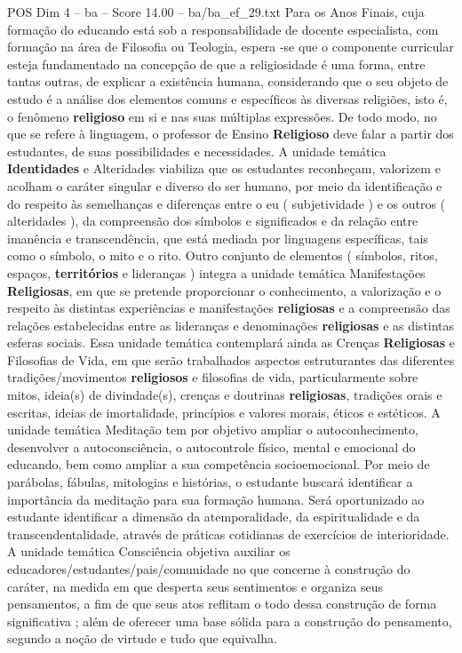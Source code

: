 \begin{textsample}{POS Dim 4 – ba – Score 14.00 – ba/ba\_ef\_29.txt}
Para os Anos Finais, cuja formação do educando está sob a responsabilidade de docente especialista, com formação na área de Filosofia ou Teologia, espera -se que o componente curricular esteja fundamentado na concepção de que a religiosidade é uma forma, entre tantas outras, de explicar a existência humana, considerando que o seu objeto de estudo é a análise dos elementos comuns e específicos às diversas religiões, isto é, o fenômeno \textbf{religioso} em si e nas suas múltiplas expressões.
De todo modo, no que se refere à linguagem, o professor de Ensino \textbf{Religioso} deve falar a partir dos estudantes, de suas possibilidades e necessidades.
A unidade temática \textbf{Identidades} e Alteridades viabiliza que os estudantes reconheçam, valorizem e acolham o caráter singular e diverso do ser humano, por meio da identificação e do respeito às semelhanças e diferenças entre o eu ( subjetividade ) e os outros ( alteridades ), da compreensão dos símbolos e significados e da relação entre imanência e transcendência, que está mediada por linguagens específicas, tais como o símbolo, o mito e o rito.
Outro conjunto de elementos ( símbolos, ritos, espaços, \textbf{territórios} e lideranças ) integra a unidade temática Manifestações \textbf{Religiosas}, em que se pretende proporcionar o conhecimento, a valorização e o respeito às distintas experiências e manifestações \textbf{religiosas} e a compreensão das relações estabelecidas entre as lideranças e denominações \textbf{religiosas} e as distintas esferas sociais.
Essa unidade temática contemplará ainda as Crenças \textbf{Religiosas} e Filosofias de Vida, em que serão trabalhados aspectos estruturantes das diferentes tradições/movimentos \textbf{religiosos} e filosofias de vida, particularmente sobre mitos, ideia(s) de divindade(s), crenças e doutrinas \textbf{religiosas}, tradições orais e escritas, ideias de imortalidade, princípios e valores morais, éticos e estéticos.
A unidade temática Meditação tem por objetivo ampliar o autoconhecimento, desenvolver a autoconsciência, o autocontrole físico, mental e emocional do educando, bem como ampliar a sua competência socioemocional.
Por meio de parábolas, fábulas, mitologias e histórias, o estudante buscará identificar a importância da meditação para sua formação humana.
Será oportunizado ao estudante identificar a dimensão da atemporalidade, da espiritualidade e da transcendentalidade, através de práticas cotidianas de exercícios de interioridade.
A unidade temática Consciência objetiva auxiliar os educadores/estudantes/pais/comunidade no que concerne à construção do caráter, na medida em que desperta seus sentimentos e organiza seus pensamentos, a fim de que seus atos reflitam o todo dessa construção de forma significativa ; além de oferecer uma base sólida para a construção do pensamento, segundo a noção de virtude e tudo que equivalha.

\end{textsample}
